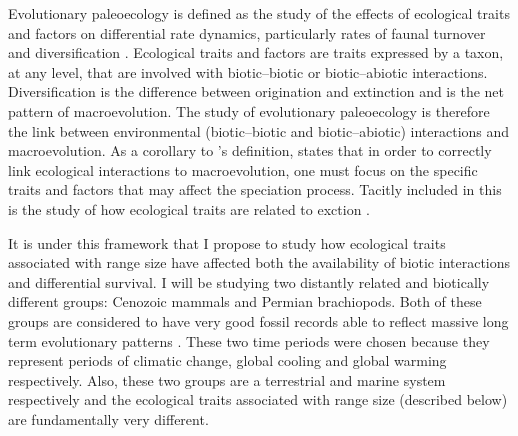 \documentclass[12pt,letterpaper]{article}
\begin{document}
Evolutionary paleoecology is defined as the study of the effects of ecological traits and factors on differential rate dynamics, particularly rates of faunal turnover and diversification \citep{Kitchell1985a}. Ecological traits and factors are traits expressed by a taxon, at any level, that are involved with biotic--biotic or biotic--abiotic interactions. Diversification is the difference between origination and extinction and is the net pattern of macroevolution. The study of evolutionary paleoecology is therefore the link between environmental (biotic--biotic and biotic--abiotic) interactions and macroevolution. As a corollary to \citet{Kitchell1985a}'s definition, \citet{Allmon1994} states that in order to correctly link ecological interactions to macroevolution, one must focus on the specific traits and factors that may affect the speciation process. Tacitly included in this is the study of how ecological traits are related to exction \citep{Kitchell1990}.


It is under this framework that I propose to study how ecological traits associated with range size have affected both the availability of biotic interactions and differential survival. I will be studying two distantly related and biotically different groups: Cenozoic mammals and Permian brachiopods. Both of these groups are considered to have very good fossil records able to reflect massive long term evolutionary patterns \citep{Mark1977}. These two time periods were chosen because they represent periods of climatic change, global cooling and global warming respectively. Also, these two groups are a terrestrial and marine system respectively and the ecological traits associated with range size (described below) are fundamentally very different. 


\end{document}
